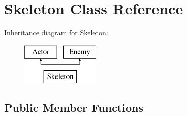 \hypertarget{classSkeleton}{}\section{Skeleton Class Reference}
\label{classSkeleton}
Inheritance diagram for Skeleton\+:\begin{figure}[H]
\begin{center}
\leavevmode
\includegraphics[height=2.000000cm]{classSkeleton}
\end{center}
\end{figure}
\subsection*{Public Member Functions}
